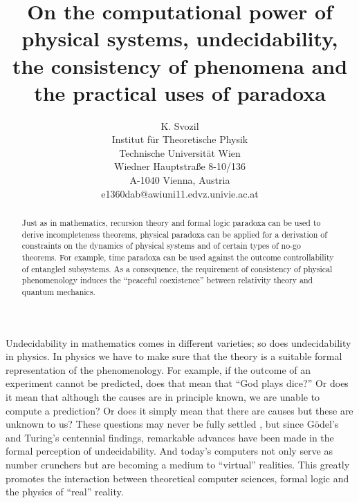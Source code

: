 
 \title{On the computational power of physical systems,
undecidability, the consistency of phenomena and
 the practical uses of paradoxa}
\author{K. Svozil\\
 {\small Institut f\"ur Theoretische Physik}  \\
  {\small Technische Universit\"at Wien   }     \\
  {\small Wiedner Hauptstra\ss e 8-10/136}    \\
  {\small A-1040 Vienna, Austria   }            \\
  {\small e1360dab@awiuni11.edvz.univie.ac.at}}
\maketitle

\begin{abstract}
Just as in mathematics, recursion theory and formal logic paradoxa can
be used to derive incompleteness theorems, physical paradoxa can be
applied for a derivation of constraints on the dynamics of physical
systems and of certain types of no-go theorems. For example,
time paradoxa can be used against the outcome controllability of
entangled
subsystems.  As a consequence, the requirement of consistency of
physical phenomenology induces the ``peaceful coexistence'' between
relativity theory and quantum mechanics.


\end{abstract}

\noindent
Undecidability in mathematics comes in different varieties;
so does undecidability in physics. In physics we have to make sure that
the theory is a suitable formal representation of the phenomenology. For
example, if the outcome of an experiment
cannot be predicted, does that mean that ``God plays dice?''
Or does it mean that although
the causes are in principle known, we are unable to compute a
prediction? Or does it simply mean that there are causes but these
are unknown
to us? These questions may never be fully settled \cite{frank}, but
since G\"odel's \cite{godel} and Turing's \cite{turing}
centennial findings, remarkable
advances have been made
in the formal perception of
undecidability. And today's computers not only serve as
number crunchers but are becoming a medium
to ``virtual'' realities. This greatly promotes the interaction between
theoretical computer sciences, formal logic and the physics of
``real'' reality.


